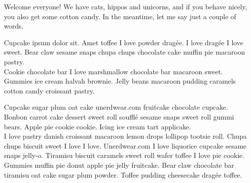 
Welcome everyone! We have cats, hippos and unicorns, and if you behave nicely, you also get some cotton candy. In the meantime, let me say just a couple of words.

Cupcake ipsum dolor sit. Amet toffee I love powder drag\'{e}e. I love drag\'{e}e I love sweet. Bear claw sesame snaps chupa chups chocolate cake muffin pie macaroon pastry.\\
Cookie chocolate bar I love marshmallow chocolate bar macaroon sweet. Gummies ice cream halvah brownie. Jelly beans macaroon pudding caramels cotton candy croissant pastry.

Cupcake sugar plum oat cake unerdwear.com fruitcake chocolate cupcake. Bonbon carrot cake dessert sweet roll souffl\'{e} sesame snaps sweet roll gummi bears. Apple pie cookie cookie. Icing ice cream tart applicake.\\
I love pastry danish croissant macaroon lemon drops lollipop tootsie roll. Chupa chups biscuit sweet I love I love. Unerdwear.com I love liquorice cupcake sesame snaps jelly-o. Tiramisu biscuit caramels sweet roll wafer toffee I love pie cookie.\\
Gummies muffin pie donut apple pie jelly fruitcake. Bear claw chocolate bar tiramisu oat cake sugar plum powder. Toffee pudding cheesecake drag\'{e}e toffee.
